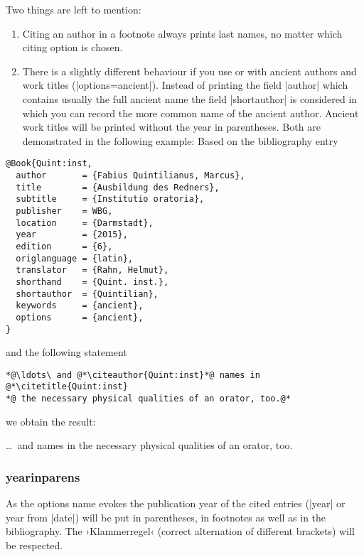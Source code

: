 \documentclass[a4paper,
10pt,
greek,
french,
spanish,
italian,
ngerman,
english
]{ltxdoc}
\begin{document}

Two things are left to mention: 
\begin{enumerate}
\item Citing an author in a footnote always prints  last names, no matter which citing option is chosen. 
\item There is a slightly different behaviour if you use   or   with ancient authors and work titles (|options={ancient}|).
Instead of printing the field |author| which contains usually the full ancient name the field |shortauthor| is considered in which you can record the more common name of the ancient author.
Ancient work titles will be printed without the year in parentheses. 
Both are demonstrated in the following example: Based on the bibliography entry
\end{enumerate}
\begin{lstlisting}[style=bibentry,label=Quint:inst,caption={{@}Book\{Quint:inst,…\} }]
@Book{Quint:inst,
  author       = {Fabius Quintilianus, Marcus},
  title        = {Ausbildung des Redners},
  subtitle     = {Institutio oratoria},
  publisher    = WBG,
  location     = {Darmstadt},
  year         = {2015},
  edition      = {6},
  origlanguage = {latin},
  translator   = {Rahn, Helmut},
  shorthand    = {Quint. inst.},
  shortauthor  = {Quintilian},
  keywords     = {ancient},
  options      = {ancient},
}
\end{lstlisting}

and the following statement

\begin{refsection}
\begin{lstlisting}
*@\ldots\ and @*\citeauthor{Quint:inst}*@ names in @*\citetitle{Quint:inst} 
*@ the necessary physical qualities of an orator, too.@*
\end{lstlisting}
 
we obtain the result:

\begin{bsp}
\ldots\ and \citeauthor{Quint:inst} names in  the  necessary physical qualities of an orator, too.
\end{bsp}
\end{refsection}


\subsubsection{yearinparens}\label{yearinparens}
%
As the options name evokes the publication year of the cited entries 
(|year| or year from |date|) will be put in parentheses,
in footnotes as well as in the bibliography. 
The ›Klammerregel‹ (correct alternation of different brackets) will be respected.
\end{document}
